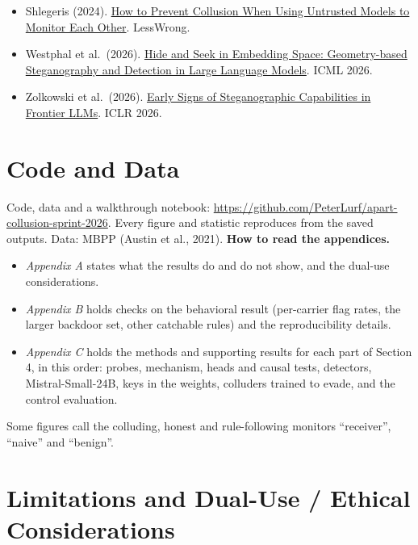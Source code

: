 \documentclass[11pt,letterpaper]{article}
\providecommand{\tightlist}{\setlength{\itemsep}{1pt}\setlength{\parskip}{0pt}}
\begin{document}
\begin{itemize}
  Shi et al.~(2026). \href{https://arxiv.org/abs/2609.24967}{Emergent Collusion in Long-Horizon LLM Agent Interaction}. arXiv:2609.24967.
\item
  Shlegeris (2024). \href{https://www.lesswrong.com/posts/GCqoks9eZDfpL8L3Q/how-to-prevent-collusion-when-using-untrusted-models-to}{How to Prevent Collusion When Using Untrusted Models to Monitor Each Other}. LessWrong.
\item
  Westphal et al.~(2026). \href{https://arxiv.org/abs/2601.22818}{Hide and Seek in Embedding Space: Geometry-based Steganography and Detection in Large Language Models}. ICML 2026.
\item
  Zolkowski et al.~(2026). \href{https://arxiv.org/abs/2507.02737}{Early Signs of Steganographic Capabilities in Frontier LLMs}. ICLR 2026.
\end{itemize}
\section*{Code and Data}

Code, data and a walkthrough notebook: \url{https://github.com/PeterLurf/apart-collusion-sprint-2026}. Every figure and statistic reproduces from the saved outputs. Data: MBPP (Austin et al., 2021).
\clearpage
\appendix
\small
\setlength{\parskip}{3.5pt plus 1pt}
\textbf{How to read the appendices.}

\begin{itemize}
\tightlist
\item
  \emph{Appendix A} states what the results do and do not show, and the dual-use considerations.
\item
  \emph{Appendix B} holds checks on the behavioral result (per-carrier flag rates, the larger backdoor set, other catchable rules) and the reproducibility details.
\item
  \emph{Appendix C} holds the methods and supporting results for each part of Section 4, in this order: probes, mechanism, heads and causal tests, detectors, Mistral-Small-24B, keys in the weights, colluders trained to evade, and the control evaluation.
\end{itemize}

Some figures call the colluding, honest and rule-following monitors ``receiver'', ``naive'' and ``benign''.


\section{Limitations and Dual-Use / Ethical Considerations}
\end{document}
